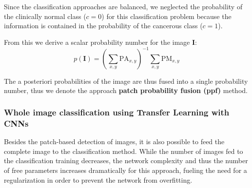 \documentclass[fleqn,10pt]{wlscirep}
\begin{document}
Since the classification approaches are balanced, we neglected the
probability of the clinically normal class ($c=0$) for this classification problem because the information
is contained in the probability of the cancerous class ($c=1$).

From this we derive a scalar probability number for the image \textbf{I}:
\begin{equation}
     p(\mathbf{I}) = \left( \sum_{x,y} \mathrm{PA}_{x,y} \right)^{-1}
     \sum_{x,y} \mathrm{PM}_{x,y}
    \label{eqn:ppf}
\end{equation}






The a posteriori probabilities of the image are thus fused into a
single probability number, thus we denote the approach \textbf{patch probability
  fusion (ppf)} method.


\vspace{0.5em}
\subsubsection{Whole image classification using Transfer Learning with CNNs}
\label{CNNimageDet}

Besides the patch-based detection of images, it is also possible to feed the complete image to the classification method. While the number of images fed to the classification training decreases, the network complexity and thus the number of free parameters increases dramatically for this approach, fueling the need for a regularization in order to prevent the network from overfitting.
\end{document}
